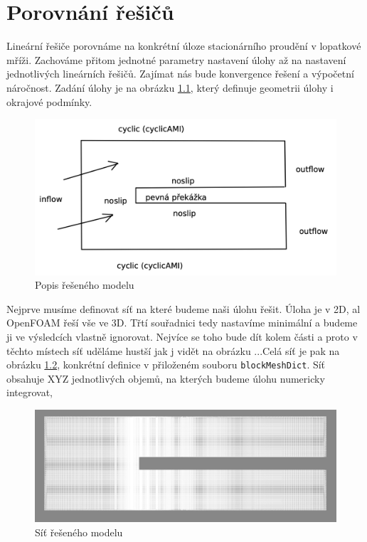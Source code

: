 \documentclass[a4paper,12pt]{report}
\theoremstyle{remark}
\begin{document}
	{\let\clearpage\relax \chapter{Porovnání řešičů}}
	
	Lineární řešiče porovnáme na konkrétní úloze stacionárního proudění v lopatkové mříži. Zachováme přitom jednotné parametry nastavení úlohy až na nastavení jednotlivých lineárních řešičů. Zajímat nás bude konvergence řešení a výpočetní náročnost. Zadání úlohy je na obrázku \ref{fig:zadani}, který definuje geometrii úlohy i okrajové podmínky. 
	
	\begin{figure}[H]
		\centering
		\includegraphics[width=1\linewidth]{zadani.png}
		\caption{Popis řešeného modelu}
		\label{fig:zadani}
	\end{figure}


Nejprve musíme definovat síť na které budeme naši úlohu řešit. Úloha je v 2D, al OpenFOAM řeší vše ve 3D. Třtí souřadnici tedy nastavíme minimální a budeme ji ve výsledcích vlastně ignorovat.  Nejvíce se toho bude dít kolem  části a proto v těchto místech síť uděláme hustší jak j vidět na obrázku ...Celá síť je pak na obrázku \ref{fig:pvmesh}, konkrétní definice v přiloženém souboru \texttt{blockMeshDict}. Síť obsahuje XYZ jednotlivých objemů, na kterých budeme úlohu numericky integrovat,


\begin{figure}[H]
	\centering
	\includegraphics[width=1\linewidth]{pv-mesh.png}
	\caption{Síť řešeného modelu}
	\label{fig:pvmesh}
\end{figure}
\end{document}
